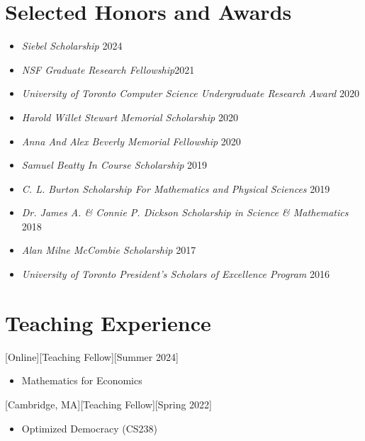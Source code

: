 \documentclass{article}
\begin{document}
     \section{Selected Honors and  Awards}
    \begin{itemize}
     \setlength\itemsep{.4ex}
        \item \textsl{Siebel Scholarship} \hfill 2024
        \item \textsl{NSF Graduate Research Fellowship}\hfill 2021
        \item \textsl{University of Toronto Computer Science Undergraduate Research Award} \hfill 2020
        \item \textsl{Harold Willet Stewart Memorial Scholarship} \hfill 2020
        \item \textsl{Anna And Alex Beverly Memorial Fellowship} \hfill 2020
        \item \textsl{Samuel Beatty In Course Scholarship} \hfill 2019
        \item \textsl{C. L. Burton Scholarship For Mathematics and Physical Sciences} \hfill 2019
        \item \textsl{Dr. James A. \& Connie P. Dickson Scholarship in Science \& Mathematics} \hfill 2018
        \item \textsl{Alan Milne McCombie Scholarship} \hfill 2017
        \item \textsl{University of Toronto President's Scholars of Excellence Program} \hfill 2016
    \end{itemize}
%    
    

    
    \section{Teaching Experience}
    [Online][Teaching Fellow][Summer 2024]
    \begin{itemize}
    	\item Mathematics for Economics
    \end{itemize}
    [Cambridge, MA][Teaching Fellow][Spring 2022]
    \begin{itemize}
        \item Optimized Democracy (CS238)
    \end{itemize}
    
\end{document}
